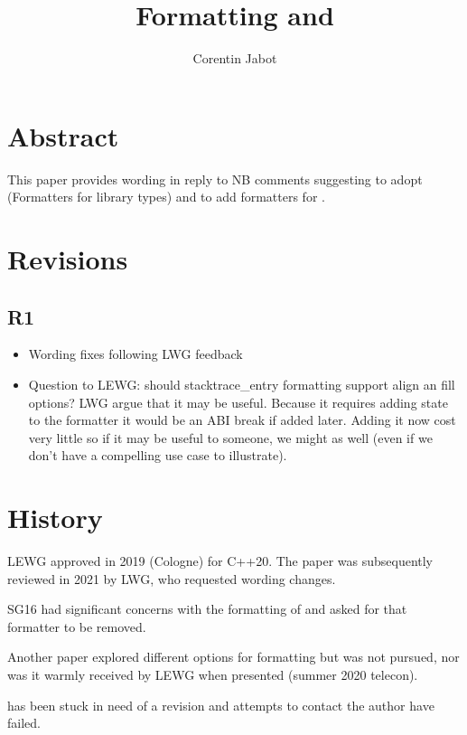 \documentclass{wg21}
\title{Formatting \tcode{thread::id} and \tcode{stacktrace}}
\author{Corentin Jabot}{corentin.jabot@gmail.com}
\begin{document}
\maketitle
\newcommand{\addedAlign}[1]{\textcolor{addclrTwo}{\uline{#1}}}

\section{Abstract}

This paper provides wording in reply to NB comments suggesting to adopt  (Formatters for library types)
and to add formatters for .

\section{Revisions}

\subsection{R1}
\begin{itemize}
\item Wording fixes following LWG feedback
\item Question to LEWG: should stacktrace_entry formatting support align an fill options? LWG argue that it may be useful. Because it requires adding state to the formatter it would be an ABI break if added later.
Adding it now cost very little so if it may be useful to someone, we might as well (even if we don't have a compelling use case to illustrate).
\end{itemize}

\section{History}

LEWG approved  in 2019 (Cologne) for C++20.
The paper was subsequently reviewed in 2021 by LWG, who requested wording changes.

SG16 had significant concerns with the formatting of  and asked for that formatter to be removed.

Another paper  explored different options for formatting  but was not pursued, nor was it warmly
received by LEWG when presented (summer 2020 telecon).

 has been stuck in need of a revision and attempts to contact the author have failed.
\end{document}
